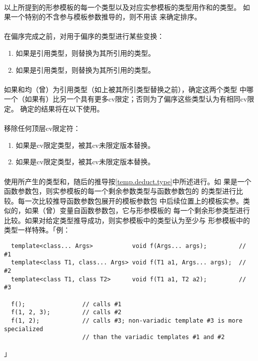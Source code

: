 \paragraph{}
以上所提到的形参模板的每一个类型以及对应实参模板的类型用作和的类型。
如果一个特别的不含参与模板参数推导的，则不用该
来确定排序。

\paragraph{}
在偏序完成之前，对用于偏序的类型进行某些变换：
\begin{enumerate}
  \item{如果是引用类型，则替换为其所引用的类型。}
  \item{如果是引用类型，则替换为其所引用的类型。}
\end{enumerate}

\paragraph{}
如果和均（曾）为引用类型（如上被其所引类型替换之前），确定这两个类型
中哪一个（如果有）比另一个具有更多cv限定；否则为了偏序这些类型认为有相同cv限定。
确定的结果将在以下使用。

\paragraph{}
移除任何顶层cv限定符：
\begin{enumerate}
  \item{如果是cv限定类型，被其cv未限定版本替换。}
  \item{如果是cv限定类型，被其cv未限定版本替换。}
\end{enumerate}

\paragraph{}
使用所产生的类型和，随后的推导按\ref{temp.deduct.type}中所述进行。如
果是一个函数参数包，则实参模板的每一个剩余参数类型与函数参数包的
的类型进行比较。每一次比较推导函数参数包展开的模板参数包
中后续位置上的模板实参。类似的，如果（曾）变量自函数参数包，它与形参模板的
每一个剩余形参类型进行比较。如果对给定类型推导成功，则实参模板中的类型认为至少与
形参模板中的类型一样特殊。「例：
\begin{lstlisting}
  template<class... Args>           void f(Args... args);         // #1
  template<class T1, class... Args> void f(T1 a1, Args... args);  // #2
  template<class T1, class T2>      void f(T1 a1, T2 a2);         // #3

  f();                // calls #1
  f(1, 2, 3);         // calls #2
  f(1, 2);            // calls #3; non-variadic template #3 is more specialized
                      // than the variadic templates #1 and #2
\end{lstlisting}」

